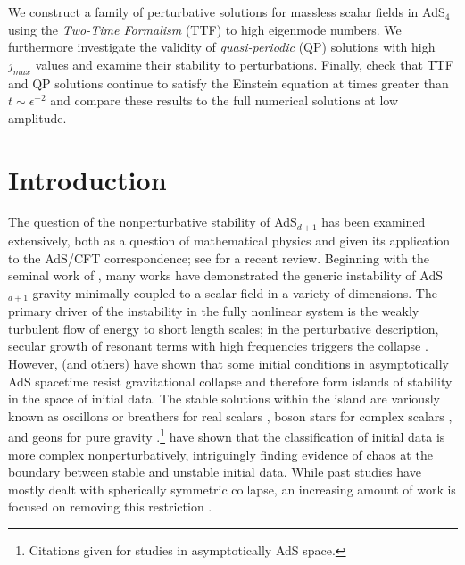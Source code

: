 \documentclass[../PhD.tex]{subfiles}
\begin{document}
We construct a family of perturbative solutions for massless scalar fields in AdS$_4$ using the \emph{Two-Time Formalism} (TTF) to high eigenmode numbers. We furthermore investigate the validity of \emph{quasi-periodic} (QP) solutions with high $j_{max}$ values and examine their stability to perturbations. Finally, check that TTF and QP solutions continue to satisfy the Einstein equation at times greater than $t \sim \epsilon^{-2}$ and compare these results to the full numerical solutions at low amplitude.


\section{Introduction}

The question of the nonperturbative stability of AdS$_{d+1}$ has been examined extensively, both as a question of mathematical physics and given its application to the AdS/CFT correspondence; see \cite{1708.05600} for a recent review. Beginning with the seminal work of \cite{1104.3702}, many works \cite{1108.4539, 1106.2339, 1110.5823, 1210.0890, 1510.02592} have demonstrated the generic instability of AdS$_{d+1}$ gravity minimally coupled to a scalar field in a variety of dimensions. The primary driver of the instability in the fully nonlinear system is the weakly turbulent flow of energy to short length scales; in the perturbative description, secular growth of resonant terms with high frequencies triggers the collapse \cite{1109.1825, 1306.0317, 1312.5544}. However, \cite{1303.3186, 1307.2875, 1403.5434} (and others) have shown that some initial conditions in asymptotically AdS spacetime resist gravitational collapse and therefore form islands of stability in the space of initial data.  The stable solutions within the island are variously known as oscillons or breathers for real scalars \cite{1104.3702,1210.0890,1303.3186,1503.07746}, boson stars for complex scalars \cite{1304.4166,1307.2875}, and geons for pure gravity \cite{1109.1825,1208.5772}.\footnote{Citations given for studies in asymptotically AdS space.} \cite{1508.02709, 1711.00454,1602.03535} have shown that the classification of initial data is more complex nonperturbatively, intriguingly finding evidence of chaos at the boundary between stable and unstable initial data. While past studies have mostly dealt with spherically symmetric collapse, an increasing amount of work is focused on removing this restriction \cite{1602.03890,1705.03065, 1706.06101}.
\end{document}
